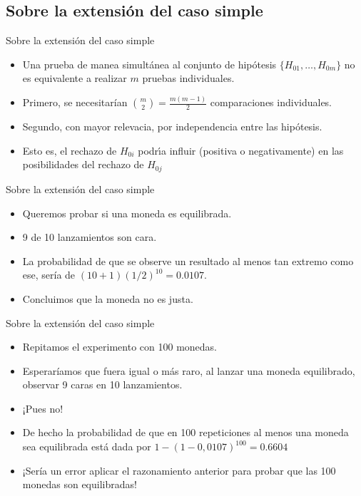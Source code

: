 \subsection{Sobre la extensión del caso simple}
\begin{frame}{Sobre la extensión del caso simple}
\begin{itemize}[<+- | alert@+>]
    \item Una prueba de manea simultánea al conjunto de hipótesis $\{H_{01},\dots,H_{0m}\}$ no es equivalente a realizar $m$ pruebas individuales.
    \item Primero, se necesitarían ${m\choose2}=\frac{m(m-1)}{2}$ comparaciones individuales.
    \item Segundo, con mayor relevacia, por independencia entre las hipótesis.
    \item Esto es, el rechazo de $H_{0i}$ podrı́a influir (positiva o negativamente) en las posibilidades del rechazo de $H_{0j}$
\end{itemize}
\end{frame}


\begin{frame}{Sobre la extensión del caso simple}
\begin{example}
    \begin{itemize}[<+- | alert@+>]
        \item Queremos probar si una moneda es equilibrada.
        \item 9 de 10 lanzamientos son cara.
        \item La probabilidad de que se observe un resultado al menos tan extremo como ese, sería de $(10 + 1)(1/2)^{10} = 0.0107$.
        \item Concluimos que la moneda no es justa.
    \end{itemize}
\end{example}
\end{frame}


\begin{frame}{Sobre la extensión del caso simple}
\begin{example}
    \begin{itemize}[<+- | alert@+>]
        \item Repitamos el experimento con 100 monedas.
        \item Esperaríamos que fuera igual o más raro, al lanzar una moneda equilibrado, observar 9 caras en 10 lanzamientos.
        \item ¡Pues no!
        \item De hecho la probabilidad de que en 100 repeticiones al menos una moneda sea equilibrada está dada por $1 - (1 - 0,0107)^{100}= 0.6604$
        \item ¡Sería un error aplicar el razonamiento anterior para probar que las 100 monedas son equilibradas!
    \end{itemize}
\end{example}
\end{frame}

